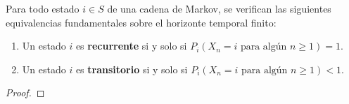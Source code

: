 \begin{teo}
    Para todo estado $i \in S$ de una cadena de Markov, se verifican las siguientes equivalencias fundamentales sobre el horizonte temporal finito:
    \begin{enumerate}
        \item Un estado $i$ es \textbf{recurrente} si y solo si $P_i(X_n = i \text{ para algún } n \geq 1) = 1$.
        \item Un estado $i$ es \textbf{transitorio} si y solo si $P_i(X_n = i \text{ para algún } n \geq 1) < 1$.
    \end{enumerate}

\begin{proof}

        
        
        

\end{proof}
\end{teo}
